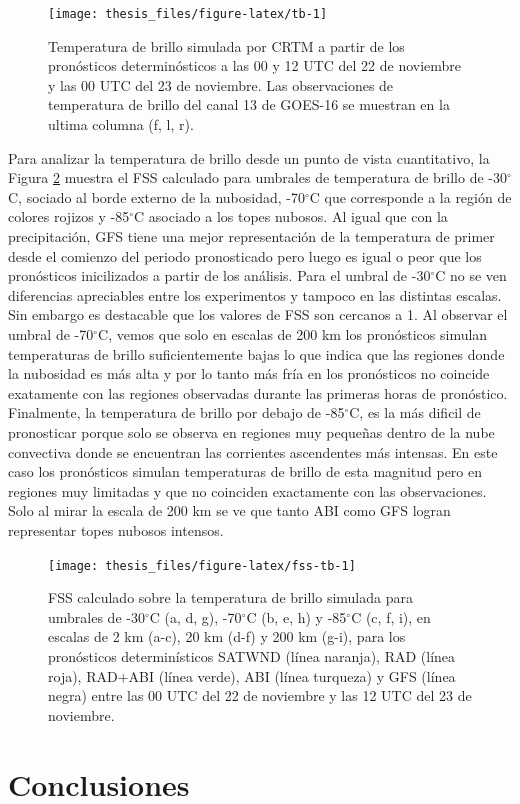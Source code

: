 \documentclass[12pt,oneside,a4paper]{reedthesis}
\begin{document}
\begin{figure}

{\centering \texttt{[image: thesis\_files/figure-latex/tb-1]} 

}

\caption{Temperatura de brillo simulada por CRTM a partir de los pronósticos determinósticos a las 00 y 12 UTC del 22 de noviembre y las 00 UTC del 23 de noviembre. Las observaciones de temperatura de brillo del canal 13 de GOES-16 se muestran en la ultima columna (f, l, r).}\label{fig:tb}
\end{figure}
Para analizar la temperatura de brillo desde un punto de vista cuantitativo, la Figura \ref{fig:fss-tb} muestra el FSS calculado para umbrales de temperatura de brillo de -30\(^\circ\)C, sociado al borde externo de la nubosidad, -70\(^\circ\)C que corresponde a la región de colores rojizos y -85\(^\circ\)C asociado a los topes nubosos. Al igual que con la precipitación, GFS tiene una mejor representación de la temperatura de primer desde el comienzo del periodo pronosticado pero luego es igual o peor que los pronósticos inicilizados a partir de los análisis. Para el umbral de -30\(^\circ\)C no se ven diferencias apreciables entre los experimentos y tampoco en las distintas escalas. Sin embargo es destacable que los valores de FSS son cercanos a 1. Al observar el umbral de -70\(^\circ\)C, vemos que solo en escalas de 200 km los pronósticos simulan temperaturas de brillo suficientemente bajas lo que indica que las regiones donde la nubosidad es más alta y por lo tanto más fría en los pronósticos no coincide exatamente con las regiones observadas durante las primeras horas de pronóstico. Finalmente, la temperatura de brillo por debajo de -85\(^\circ\)C, es la más dificil de pronosticar porque solo se observa en regiones muy pequeñas dentro de la nube convectiva donde se encuentran las corrientes ascendentes más intensas. En este caso los pronósticos simulan temperaturas de brillo de esta magnitud pero en regiones muy limitadas y que no coinciden exactamente con las observaciones. Solo al mirar la escala de 200 km se ve que tanto ABI como GFS logran representar topes nubosos intensos.


\begin{figure}
\texttt{[image: thesis\_files/figure-latex/fss-tb-1]} \caption{FSS calculado sobre la temperatura de brillo simulada para umbrales de -30\(^\circ\)C (a, d, g), -70\(^\circ\)C (b, e, h) y -85\(^\circ\)C (c, f, i), en escalas de 2 km (a-c), 20 km (d-f) y 200 km (g-i), para los pronósticos determinísticos SATWND (línea naranja), RAD (línea roja), RAD+ABI (línea verde), ABI (línea turqueza) y GFS (línea negra) entre las 00 UTC del 22 de noviembre y las 12 UTC del 23 de noviembre.}\label{fig:fss-tb}
\end{figure}
\hypertarget{conclusiones-2}{%
\section{Conclusiones}\label{conclusiones-2}}
\end{document}
